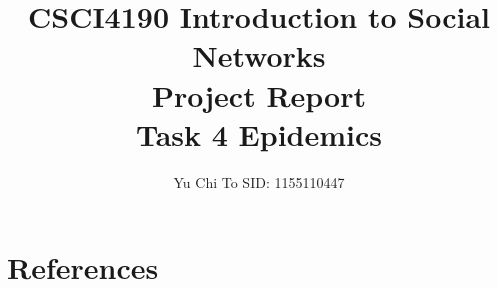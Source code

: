 \documentclass[a4paper]{article}
\title{CSCI4190 Introduction to Social Networks\\Project Report\\Task 4 Epidemics}
\author{Yu Chi To SID: 1155110447}
\begin{document}
  \maketitle
  \newpage
  
  \newpage
  \tableofcontents
  \newpage
  \listoffigures
  \newpage

  

  

  

  \newpage
  
  \FloatBarrier

  \nocite{easley_kleinberg_2019}

  \newpage
  \section{References}
  \printbibliography[heading=none]
\end{document}
